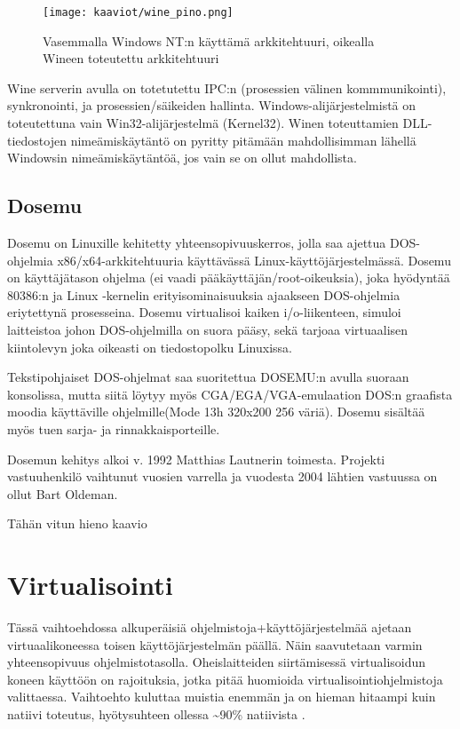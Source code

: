 \lipsum[1-3]

\begin{figure}[H]
\centering
\texttt{[image: kaaviot/wine\_pino.png]}
\caption{Vasemmalla Windows NT:n käyttämä arkkitehtuuri, oikealla Wineen toteutettu arkkitehtuuri}
\end{figure}

Wine serverin avulla on totetutettu IPC:n (prosessien välinen kommmunikointi), synkronointi, ja prosessien/säikeiden hallinta. Windows-alijärjestelmistä on toteutettuna vain Win32-alijärjestelmä (Kernel32). Winen toteuttamien DLL-tiedostojen nimeämiskäytäntö on pyritty pitämään mahdollisimman lähellä Windowsin nimeämiskäytäntöä, jos vain se on ollut mahdollista. \cite{wine:architecture}

\subsection{Dosemu}

Dosemu on Linuxille kehitetty yhteensopivuuskerros, jolla saa ajettua DOS-ohjelmia x86/x64-arkkitehtuuria käyttävässä Linux-käyttöjärjestelmässä. Dosemu on käyttäjätason ohjelma (ei vaadi pääkäyttäjän/root-oikeuksia), joka hyödyntää 80386:n ja Linux -kernelin erityisominaisuuksia ajaakseen DOS-ohjelmia eriytettynä prosesseina. Dosemu virtualisoi kaiken i/o-liikenteen, simuloi laitteistoa johon DOS-ohjelmilla on suora pääsy, sekä tarjoaa virtuaalisen kiintolevyn joka oikeasti on tiedostopolku Linuxissa.

Tekstipohjaiset DOS-ohjelmat saa suoritettua DOSEMU:n avulla suoraan konsolissa, mutta siitä löytyy myös CGA/EGA/VGA-emulaation DOS:n graafista moodia käyttäville ohjelmille(Mode 13h 320x200 256 väriä). Dosemu sisältää myös tuen sarja- ja rinnakkaisporteille.

Dosemun kehitys alkoi v. 1992 Matthias Lautnerin toimesta. Projekti vastuuhenkilö vaihtunut vuosien varrella ja vuodesta 2004 lähtien vastuussa on ollut Bart Oldeman.

\lipsum[1-3]

Tähän vitun hieno kaavio



\section{Virtualisointi}

Tässä vaihtoehdossa alkuperäisiä ohjelmistoja+käyttöjärjestelmää ajetaan virtuaalikoneessa toisen käyttöjärjestelmän päällä. Näin saavutetaan varmin yhteensopivuus ohjelmistotasolla. Oheislaitteiden siirtämisessä virtualisoidun koneen käyttöön on rajoituksia, jotka pitää huomioida virtualisointiohjelmistoja valittaessa. Vaihtoehto kuluttaa muistia enemmän ja on hieman hitaampi kuin natiivi toteutus, hyötysuhteen ollessa \textasciitilde{}90\%  natiivista \cite{virtnat_anadtech}. 

